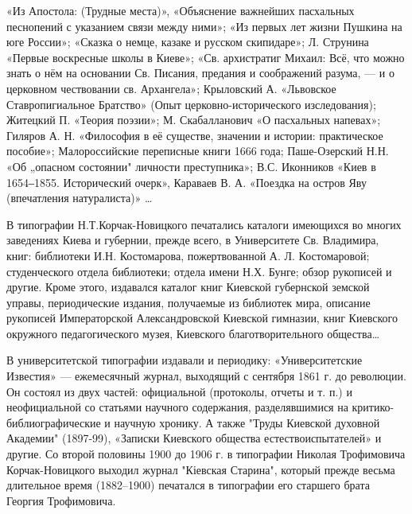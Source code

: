 «Из Апостола: (Трудные места)», «Объяснение важнейших пасхальных песнопений с
указанием связи между ними»; «Из первых лет жизни Пушкина на юге России»;
«Сказка о немце, казаке и русском скипидаре»; Л. Струнина «Первые воскресные
школы в Киеве»; «Св. архистратиг Михаил: Всё, что можно знать о нём на
основании Св. Писания, предания и соображений разума, — и о церковном
чествовании св. Архангела»; Крыловский А. «Львовское Ставропигиальное Братство»
(Опыт церковно-исторического изследования); Житецкий П. «Теория поэзии»; М.
Скабалланович «О пасхальных напевах»; Гиляров А. Н. «Философия в её существе,
значении и истории: практическое пособие»;  Малороссийские переписные книги
1666 года; Паше-Озерский Н.Н. «Об „опасном состоянии" личности преступника»;
В.С. Иконников «Киев в 1654‒1855. Исторический очерк», Караваев В. А. «Поездка
на остров Яву (впечатления натуралиста)» …

В типографии Н.Т.Корчак-Новицкого печатались каталоги имеющихся во многих
заведениях Киева и губернии, прежде всего, в Университете Св. Владимира, книг:
библиотеки И.Н. Костомарова, пожертвованной А. Л. Костомаровой; студенческого
отдела библиотеки; отдела имени Н.Х. Бунге; обзор рукописей и другие. Кроме
этого, издавался каталог книг Киевской губернской земской управы, периодические
издания, получаемые из библиотек мира, описание рукописей Императорской
Александровской Киевской гимназии, книг Киевского окружного педагогического
музея, Киевского благотворительного общества…

В университетской типографии издавали и периодику: «Университетские Известия»
— ежемесячный журнал, выходящий с сентября 1861 г. до революции. Он состоял из
двух частей: официальной (протоколы, отчеты и т. п.) и неофициальной со
статьями научного содержания, разделявшимися на критико-библиографические и
научную хронику. А также "Труды Киевской духовной Академии" (1897-99), «Записки
Киевского общества естествоиспытателей» и другие. Со второй половины 1900 до
1906 г. в типографии Николая Трофимовича Корчак-Новицкого выходил журнал
"Кіевская Старина", который прежде весьма длительное время (1882–1900)
печатался в типографии его старшего брата Георгия Трофимовича.

